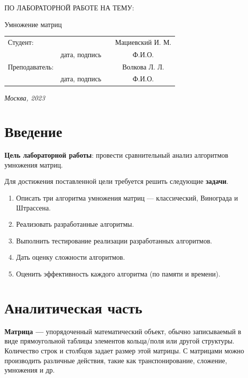 \documentclass[12pt, a4paper]{article}
\begin{document}
\begin{titlepage}
\begin{center}
\begin{bf}
    \fontsize{20}{30}\selectfont
    ПО ЛАБОРАТОРНОЙ РАБОТЕ НА ТЕМУ:

    Умножение матриц

   \end{bf}
  \end{center}

  \fontsize{14}{21}\selectfont
  \vspace{5cm}


  \noindent\begin{tabularx}{\textwidth}{ X >{\centering}p{4cm} p{1cm} c }
   Студент: & & & Мациевский И. М. \\ \cline{2-2} \cline{4-4}
   & \fontsize{10}{15}\selectfont дата, подпись & & \fontsize{10}{15}\selectfont Ф.И.О. \\
   Преподаватель: & & & Волкова Л. Л.\\ \cline{2-2} \cline{4-4}
   & \fontsize{10}{15}\selectfont дата, подпись & & \fontsize{10}{15}\selectfont Ф.И.О.
   \end{tabularx}

  \vspace{\fill}

  \begin{center}
   \it{Москва}, 2023
  \end{center}

  \thispagestyle{empty}
\end{titlepage}\newpage
\tableofcontents
\newpage
\section*{Введение}
\justifying
\textbf{Цель лабораторной работы}: провести сравнительный анализ алгоритмов умножения матриц.

Для достижения поставленной цели требуется решить следующие \textbf{задачи}.
\begin{enumerate}
\item Описать три алгоритма умножения матриц --- классический, Винограда и 
Штрассена.
\item Реализовать разработанные алгоритмы.
\item Выполнить тестирование реализации разработанных алгоритмов.
\item Дать оценку сложности алгоритмов.
\item Оценить эффективность каждого алгоритма (по памяти и времени).
\end{enumerate}
\newpage
\section{Аналитическая часть}
\textbf{Матрица ---} упорядоченный математический 
объект, обычно записываемый в виде прямоугольной 
таблицы элементов кольца/поля или другой структуры. 
Количество строк и столбцов задает размер этой 
матрицы. С матрицами можно производить различные 
действия, такие как транспонирование, сложение, 
умножения и др. 
\end{document}
